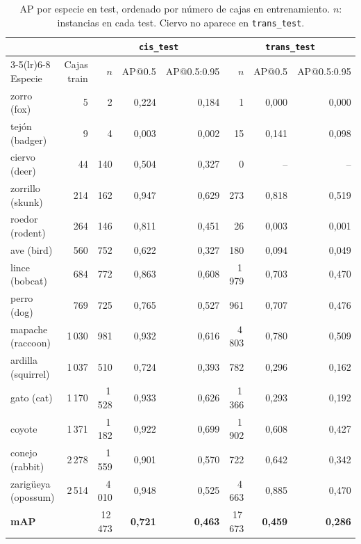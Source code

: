 \begin{table}[h]
  \centering
  \caption{AP por especie en test, ordenado por número de cajas en
  entrenamiento. $n$: instancias en cada test. Ciervo no aparece en
  \texttt{trans\_test}.}
  \label{tab:especies}
  \small
  \begin{tabular}{lrrrrrrr}
    \toprule
     & & \multicolumn{3}{c}{\texttt{cis\_test}} & \multicolumn{3}{c}{\texttt{trans\_test}} \\
    \cmidrule(lr){3-5}\cmidrule(lr){6-8}
    Especie & Cajas train & $n$ & AP@0.5 & AP@0.5:0.95 & $n$ & AP@0.5 & AP@0.5:0.95 \\
    \midrule
    zorro (fox)          &     5 &     2 & 0,224 & 0,184 &     1 & 0,000 & 0,000 \\
    tejón (badger)       &     9 &     4 & 0,003 & 0,002 &    15 & 0,141 & 0,098 \\
    ciervo (deer)        &    44 &   140 & 0,504 & 0,327 &     0 & --    & --    \\
    zorrillo (skunk)     &   214 &   162 & 0,947 & 0,629 &   273 & 0,818 & 0,519 \\
    roedor (rodent)      &   264 &   146 & 0,811 & 0,451 &    26 & 0,003 & 0,001 \\
    ave (bird)           &   560 &   752 & 0,622 & 0,327 &   180 & 0,094 & 0,049 \\
    lince (bobcat)       &   684 &   772 & 0,863 & 0,608 & 1\,979 & 0,703 & 0,470 \\
    perro (dog)          &   769 &   725 & 0,765 & 0,527 &   961 & 0,707 & 0,476 \\
    mapache (raccoon)    & 1\,030 &   981 & 0,932 & 0,616 & 4\,803 & 0,780 & 0,509 \\
    ardilla (squirrel)   & 1\,037 &   510 & 0,724 & 0,393 &   782 & 0,296 & 0,162 \\
    gato (cat)           & 1\,170 & 1\,528 & 0,933 & 0,626 & 1\,366 & 0,293 & 0,192 \\
    coyote               & 1\,371 & 1\,182 & 0,922 & 0,699 & 1\,902 & 0,608 & 0,427 \\
    conejo (rabbit)      & 2\,278 & 1\,559 & 0,901 & 0,570 &   722 & 0,642 & 0,342 \\
    zarigüeya (opossum)  & 2\,514 & 4\,010 & 0,948 & 0,525 & 4\,663 & 0,885 & 0,470 \\
    \midrule
    \textbf{mAP}         &       & 12\,473 & \textbf{0,721} & \textbf{0,463} & 17\,673 & \textbf{0,459} & \textbf{0,286} \\
    \bottomrule
  \end{tabular}
\end{table}

